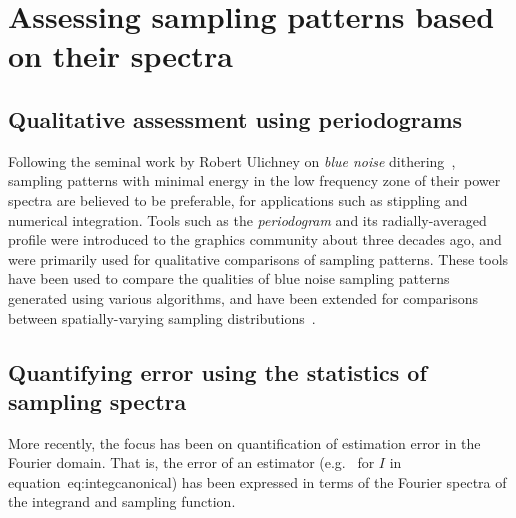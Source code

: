 %
%
%
\section{Assessing sampling patterns based on their spectra}

\subsection{Qualitative assessment using periodograms}
Following the seminal work by Robert Ulichney on \emph{blue noise} dithering~\cite{Ulichney:87:halftoning}, sampling patterns with minimal energy in the low frequency zone of their power spectra are believed to be preferable, for applications such as stippling and numerical integration. Tools such as the \emph{periodogram} and its radially-averaged profile were introduced to the graphics community about three decades ago, and were primarily used for qualitative comparisons of sampling patterns. 
%
These tools have been used to compare the qualities of blue noise sampling patterns generated using various algorithms, and have been extended for comparisons between spatially-varying sampling distributions~\cite{Wei:2011:DDA}. 

\subsection{Quantifying error using the statistics of sampling spectra}
More recently, the focus has been on quantification of estimation error in the Fourier domain. That is, the error of an estimator (e.g.~ for $I$ in equation~{eq:integcanonical}) has been expressed in terms of the Fourier spectra of the integrand and sampling function. 

